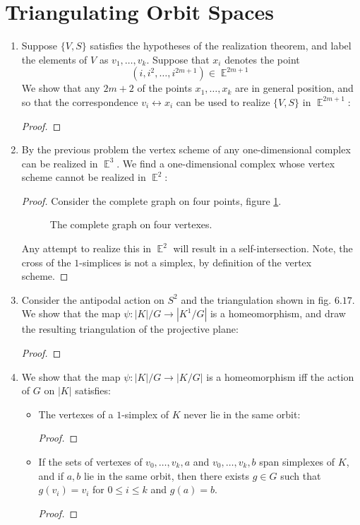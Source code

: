 \documentclass{book}
\DeclareMathOperator*{\E}{\mathbb{E}}
\begin{document}
\section{Triangulating Orbit Spaces}
\begin{enumerate}[(1)]
    \item Suppose $\{V,S\}$ satisfies the hypotheses of the realization theorem, and label the elements of $V$ as $v_1, \dots, v_k$. Suppose that $x_i$ denotes the point 
        \[(i, i^2, \dots, i^{2m+1}) \in \E^{2m+1}\]
        We show that any $2m +2$ of the points $x_1, \dots, x_k$ are in general position, and so that the correspondence $v_i \leftrightarrow x_i$ can be used to realize $\{V,S\}$ in $\E^{2m+1}$:   
        \begin{proof} 
        \end{proof}

    \item By the previous problem the vertex scheme of any one-dimensional complex can be realized in $\E^3$. We find a one-dimensional complex whose vertex scheme cannot be realized in $\E^2$:   
        \begin{proof} Consider the complete graph on four points, figure \hyperref[fig:tikz:K4]{\ref{fig:tikz:K4}}. 
            \begin{figure}
                \centering
                
                \caption{The complete graph on four vertexes.}
                \label{fig:tikz:K4}
            \end{figure}
            \par Any attempt to realize this in $\E^2$ will result in a self-intersection. Note, the cross of the $1$-simplices is not a simplex, by definition of the vertex scheme. 
        \end{proof}

    \item Consider the antipodal action on $S^2$ and the triangulation shown in fig. $6.17$. We show that the map $\psi: |K|/G \rightarrow |K^1/G|$ is a homeomorphism, and draw the resulting triangulation of the projective plane:     
        \begin{proof}
        \end{proof}

    \item We show that the map $\psi : |K|/G \rightarrow |K/G|$ is a homeomorphism iff the action of $G$ on $|K|$ satisfies:
        \begin{itemize}
            \item The vertexes of a $1$-simplex of $K$ never lie in the same orbit:
                \begin{proof}
                \end{proof}
            \item If the sets of vertexes of $v_0, \dots, v_k, a$ and $v_0, \dots, v_k, b$ span simplexes of $K$, and if $a,b$ lie in the same orbit, then there exists $g \in G$ such that $g(v_i) = v_i$ for $0 \leq i \leq k$ and $g(a) = b$. 
                \begin{proof}
                \end{proof}
        \end{itemize}


\end{enumerate}
\end{document}
